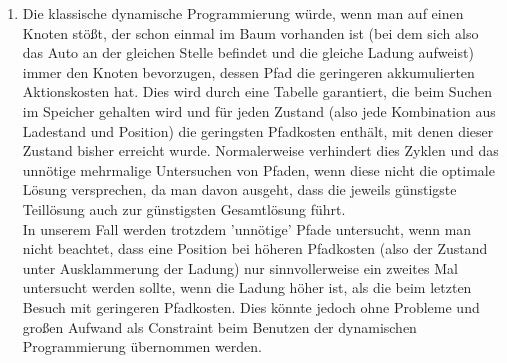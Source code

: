\documentclass[a4paper,10pt]{article}
\begin{document}
\begin{enumerate}[~~a)]
    \item 
    Die klassische dynamische Programmierung würde, wenn man auf einen Knoten stößt, der schon einmal im Baum vorhanden ist (bei dem sich also das Auto an der gleichen Stelle befindet und die gleiche Ladung aufweist) immer den Knoten bevorzugen, dessen Pfad die geringeren akkumulierten Aktionskosten hat. Dies wird durch eine Tabelle garantiert, die beim Suchen im Speicher gehalten wird und für jeden Zustand (also jede Kombination aus Ladestand und Position) die geringsten Pfadkosten enthält, mit denen dieser Zustand bisher erreicht wurde. Normalerweise verhindert dies Zyklen und das unnötige mehrmalige Untersuchen von Pfaden, wenn diese nicht die optimale Lösung versprechen, da man davon ausgeht, dass die jeweils günstigste Teillösung auch zur günstigsten Gesamtlösung führt. \\
    In unserem Fall werden trotzdem 'unnötige' Pfade untersucht, wenn man nicht beachtet, dass eine Position bei höheren Pfadkosten (also der Zustand unter Ausklammerung der Ladung) nur sinnvollerweise ein zweites Mal untersucht werden sollte, wenn die Ladung höher ist, als die beim letzten Besuch mit geringeren Pfadkosten. Dies könnte jedoch ohne Probleme und großen Aufwand als Constraint beim Benutzen der dynamischen Programmierung übernommen werden.
\end{enumerate}
\end{document}
